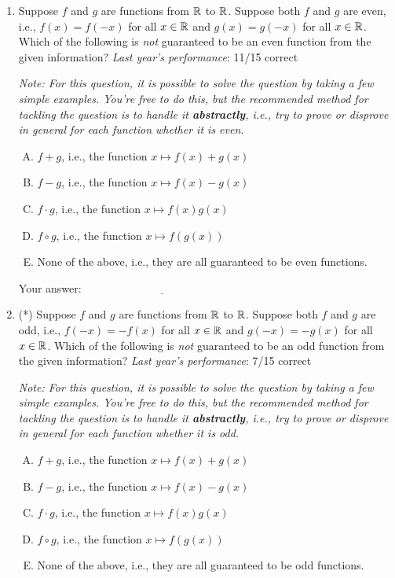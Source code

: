 \documentclass[10pt]{amsart}
\begin{document}
\begin{enumerate}

\item Suppose $f$ and $g$ are functions from $\mathbb{R}$ to $\mathbb{R}$. Suppose
  both $f$ and $g$ are even, i.e., $f(x) = f(-x)$ for all $x \in \mathbb{R}$
  and $g(x) = g(-x)$ for all $x \in \mathbb{R}$. Which of the following is
  {\em not} guaranteed to be an even function from the given
  information? {\em Last year's performance}: 11/15 correct

  {\em Note: For this question, it is possible to solve the question
  by taking a few simple examples. You're free to do this, but the
  recommended method for tackling the question is to handle it {\bf
  abstractly}, i.e., try to prove or disprove in general for each
  function whether it is even.}

  \begin{enumerate}[(A)]
  \item $f + g$, i.e., the function $x \mapsto f(x) + g(x)$
  \item $f - g$, i.e., the function $x \mapsto f(x) - g(x)$
  \item $f \cdot g$, i.e., the function $x \mapsto f(x)g(x)$
  \item $f \circ g$, i.e., the function $x \mapsto f(g(x))$
  \item None of the above, i.e., they are all guaranteed to be even
    functions.
  \end{enumerate}

  \vspace{0.1in}
  Your answer: $\underline{\qquad\qquad\qquad\qquad\qquad\qquad\qquad}$
  \vspace{1.5in}
  
\item (*) Suppose $f$ and $g$ are functions from $\mathbb{R}$ to $\mathbb{R}$. Suppose
  both $f$ and $g$ are odd, i.e., $f(-x) = -f(x)$ for all $x \in \mathbb{R}$
  and $g(-x) = -g(x)$ for all $x \in \mathbb{R}$. Which of the following is
  {\em not} guaranteed to be an odd function from the given
  information? {\em Last year's performance}: 7/15 correct

  {\em Note: For this question, it is possible to solve the question
  by taking a few simple examples. You're free to do this, but the
  recommended method for tackling the question is to handle it {\bf
  abstractly}, i.e., try to prove or disprove in general for each
  function whether it is odd.}

  \begin{enumerate}[(A)]
  \item $f + g$, i.e., the function $x \mapsto f(x) + g(x)$
  \item $f - g$, i.e., the function $x \mapsto f(x) - g(x)$
  \item $f \cdot g$, i.e., the function $x \mapsto f(x)g(x)$
  \item $f \circ g$, i.e., the function $x \mapsto f(g(x))$
  \item None of the above, i.e., they are all guaranteed to be odd functions.
  \end{enumerate}


\end{enumerate}
\end{document}
